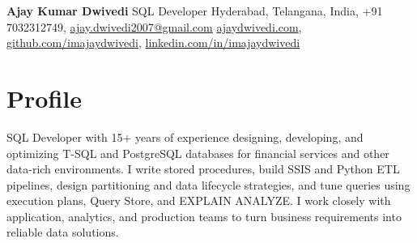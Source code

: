 \documentclass[10pt,a4paper]{article}
\begin{document}
\begin{center}
{\Huge\bfseries Ajay Kumar Dwivedi}
\vspace{4pt}
{\large\color{accent}SQL Developer}
\vspace{6pt}
Hyderabad, Telangana, India, +91 7032312749, \href{mailto:ajay.dwivedi2007@gmail.com}{ajay.dwivedi2007@gmail.com}
\vspace{2pt}
\href{https://ajaydwivedi.com/}{ajaydwivedi.com}, \href{https://github.com/imajaydwivedi}{github.com/imajaydwivedi}, \href{https://linkedin.com/in/imajaydwivedi/}{linkedin.com/in/imajaydwivedi}
\end{center}
\section{Profile}
SQL Developer with 15+ years of experience designing, developing, and optimizing T-SQL and PostgreSQL databases for financial services and other data-rich environments. I write stored procedures, build SSIS and Python ETL pipelines, design partitioning and data lifecycle strategies, and tune queries using execution plans, Query Store, and EXPLAIN ANALYZE. I work closely with application, analytics, and production teams to turn business requirements into reliable data solutions.
\end{document}
